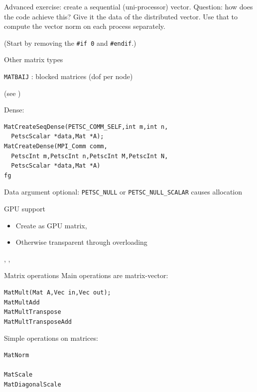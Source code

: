\begin{longstory}
\begin{details}
\begin{exerciseframe}[matvec]
  Advanced exercise: create a sequential (uni-processor)
  vector. Question: how does the code achieve this?
  Give it the data of the distributed vector. Use that to compute the
  vector norm on each process separately.

  (Start by removing the \verb+#if 0+ and \verb+#endif+.)
\end{exerciseframe}

\begin{numberedframe}{Other matrix types}

\lstinline{MATBAIJ} : blocked matrices (dof per node)

(see )

Dense:
\begin{lstlisting}
MatCreateSeqDense(PETSC_COMM_SELF,int m,int n,
  PetscScalar *data,Mat *A);
MatCreateDense(MPI_Comm comm,
  PetscInt m,PetscInt n,PetscInt M,PetscInt N,
  PetscScalar *data,Mat *A)
fg\end{lstlisting}
Data argument optional:
\lstinline{PETSC_NULL} or \lstinline{PETSC_NULL_SCALAR} causes allocation
\end{numberedframe}

\begin{numberedframe}{GPU support}
  \begin{itemize}
  \item Create as GPU matrix,
  \item Otherwise transparent through overloading
  \end{itemize}
,
,
\end{numberedframe}

\begin{numberedframe}{}
\end{numberedframe}

\end{details}

\end{longstory}

\begin{numberedframe}{Matrix operations}
Main operations are matrix-vector:
\begin{lstlisting}
MatMult(Mat A,Vec in,Vec out);
MatMultAdd
MatMultTranspose
MatMultTransposeAdd
\end{lstlisting}

Simple operations on matrices:
\begin{lstlisting}
MatNorm

MatScale
MatDiagonalScale
\end{lstlisting}
\end{numberedframe}

